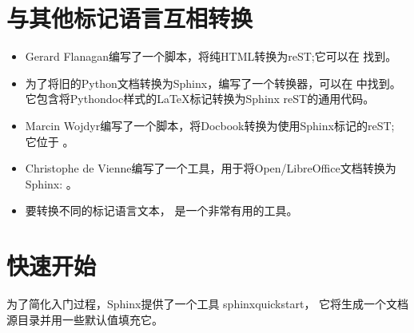 \documentclass[a4paper,10pt,english]{sphinxmanual}
\begin{document}
\section{与其他标记语言互相转换}
\label{\detokenize{sphinx_intro:id4}}\begin{itemize}
\item {} 
\sphinxAtStartPar
Gerard Flanagan编写了一个脚本，将纯HTML转换为reST;它可以在  找到。

\item {} 
\sphinxAtStartPar
为了将旧的Python文档转换为Sphinx，编写了一个转换器，可以在  中找到。
它包含将Python\sphinxhyphen{}doc样式的LaTeX标记转换为Sphinx reST的通用代码。

\item {} 
\sphinxAtStartPar
Marcin Wojdyr编写了一个脚本，将Docbook转换为使用Sphinx标记的reST; 它位于  。

\item {} 
\sphinxAtStartPar
Christophe de Vienne编写了一个工具，用于将Open/LibreOffice文档转换为Sphinx:  。

\item {} 
\sphinxAtStartPar
要转换不同的标记语言文本， 是一个非常有用的工具。

\end{itemize}


\section{快速开始}
\label{\detokenize{sphinx_intro:id5}}
\sphinxAtStartPar
为了简化入门过程，Sphinx提供了一个工具 sphinx\sphinxhyphen{}quickstart，
它将生成一个文档源目录并用一些默认值填充它。

\begin{sphinxVerbatim}[commandchars=\\\{\}]
    
\end{sphinxVerbatim}

\begin{sphinxVerbatim}[commandchars=\\\{\}]
\end{sphinxVerbatim}
\end{document}
